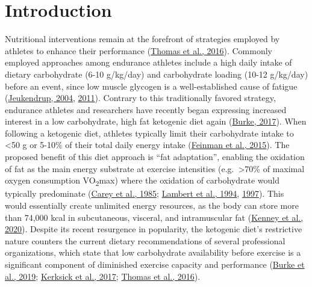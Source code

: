 \documentclass[]{cik}%
\begin{document}

\maketitle

\newpage

\captionsetup[table]{labelformat=empty}
\captionsetup[figure]{labelformat=empty}
\raggedbottom

\hypertarget{introduction}{%
\section{Introduction}\label{introduction}}

Nutritional interventions remain at the forefront of strategies employed
by athletes to enhance their performance
(\protect\hyperlink{ref-1}{Thomas et al., 2016}). Commonly employed
approaches among endurance athletes include a high daily intake of
dietary carbohydrate (6-10 g/kg/day) and carbohydrate loading (10-12
g/kg/day) before an event, since low muscle glycogen is a
well-established cause of fatigue (\protect\hyperlink{ref-2}{Jeukendrup,
2004}, \protect\hyperlink{ref-3}{2011}). Contrary to this traditionally
favored strategy, endurance athletes and researchers have recently began
expressing increased interest in a low carbohydrate, high fat ketogenic
diet again (\protect\hyperlink{ref-4}{Burke, 2017}). When following a
ketogenic diet, athletes typically limit their carbohydrate intake to
\textless50 g or 5-10\% of their total daily energy intake
(\protect\hyperlink{ref-5}{Feinman et al., 2015}). The proposed benefit
of this diet approach is ``fat adaptation'', enabling the oxidation of
fat as the main energy substrate at exercise intensities
(e.g.~\textgreater70\% of maximal oxygen consumption
VO\textsubscript{2}max) where the oxidation of carbohydrate would
typically predominate (\protect\hyperlink{ref-6}{Carey et al., 1985};
\protect\hyperlink{ref-7}{Lambert et al., 1994},
\protect\hyperlink{ref-8}{1997}). This would essentially create
unlimited energy resources, as the body can store more than 74,000 kcal
in subcutaneous, visceral, and intramuscular fat
(\protect\hyperlink{ref-9}{Kenney et al., 2020}). Despite its recent
resurgence in popularity, the ketogenic diet's restrictive nature
counters the current dietary recommendations of several professional
organizations, which state that low carbohydrate availability before
exercise is a significant component of diminished exercise capacity and
performance (\protect\hyperlink{ref-10}{Burke et al., 2019};
\protect\hyperlink{ref-11}{Kerksick et al., 2017};
\protect\hyperlink{ref-1}{Thomas et al., 2016}).
\end{document}
